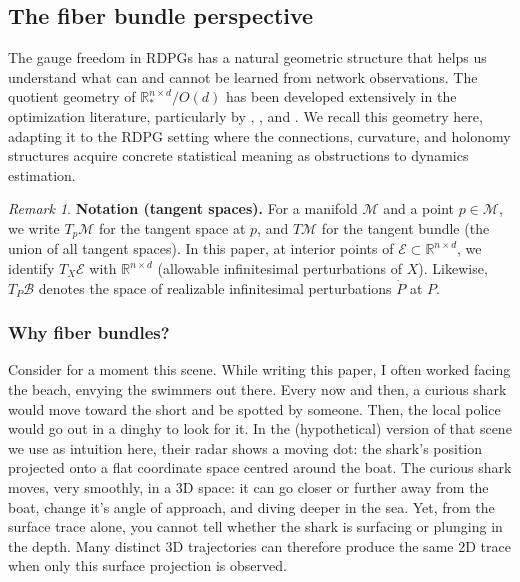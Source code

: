 \documentclass{article}
\newcommand{\RR}{\mathbb{R}}
\theoremstyle{plain}
\theoremstyle{definition}
\theoremstyle{remark}
\newtheorem*{remark}{Remark}
\begin{document}
\subsection{The fiber bundle perspective}\label{sec:fiber-bundle}

The gauge freedom in RDPGs has a natural geometric structure that helps us understand what can and cannot be learned from network observations.
The quotient geometry of $\RR_*^{n \times d} / O(d)$ has been developed extensively in the optimization literature, particularly by \citet{absil2008optimization}, \citet{journee2010low}, and \citet{massart2020quotient,massart2019curvature}.
We recall this geometry here, adapting it to the RDPG setting where the connections, curvature, and holonomy structures acquire concrete statistical meaning as obstructions to dynamics estimation.

\begin{remark}
\textbf{Notation (tangent spaces).} For a manifold $\mathcal{M}$ and a point $p \in \mathcal{M}$, we write $T_p \mathcal{M}$ for the tangent space at $p$, and $T \mathcal{M}$ for the tangent bundle (the union of all tangent spaces).
In this paper, at interior points of $\mathcal{E} \subset \RR^{n \times d}$, we identify $T_X \mathcal{E}$ with $\RR^{n \times d}$ (allowable infinitesimal perturbations of $X$). Likewise, $T_P \mathcal{B}$ denotes the space of realizable infinitesimal perturbations $\dot{P}$ at $P$.
\end{remark}

\subsubsection{Why fiber bundles?}

Consider for a moment this scene. While writing this paper, I often worked facing the beach, envying the swimmers out there. Every now and then, a curious shark would move toward the short and be spotted by someone. Then, the local police would go out in a dinghy to look for it. In the (hypothetical) version of that scene we use as intuition here, their radar shows a moving dot: the shark's position projected onto a flat coordinate space centred around the boat. The curious shark moves, very smoothly, in a 3D space: it can go closer or further away from the boat, change it's angle of approach, and diving deeper in the sea. Yet, from the surface trace alone, you cannot tell whether the shark is surfacing or plunging in the depth. Many distinct 3D trajectories can therefore produce the same 2D trace when only this surface projection is observed.
\end{document}
